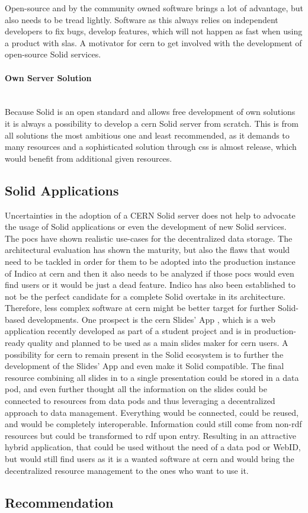 Open-source and by the community owned software brings a lot of advantage, but also needs to be tread lightly. Software as this always relies on independent developers to fix bugs, develop features, which will not happen as fast when using a product with \glspl{sla}. A motivator for \gls{cern} to get involved with the development of open-source Solid services.
\vspace{0.5cm}
\paragraph{Own Server Solution}\mbox{}\\

Because Solid is an open standard and allows free development of own solutions it is always a possibility to develop a \gls{cern} Solid server from scratch. This is from all solutions the most ambitious one and least recommended, as it demands to many resources and a sophisticated solution through \gls{css} is almost release, which would benefit from additional given resources.

\subsection{Solid Applications}

Uncertainties in the adoption of a CERN Solid server does not help to advocate the usage of Solid applications or even the development of new Solid services. The \glspl{poc} have shown realistic use-cases for the decentralized data storage. The architectural evaluation has shown the maturity, but also the flaws that would need to be tackled in order for them to be adopted into the production instance of Indico at \gls{cern} and then it also needs to be analyzed if those \glspl{poc} would even find users or it would be just a dead feature. Indico has also been established to not be the perfect candidate for a complete Solid overtake in its architecture. Therefore, less complex software at \gls{cern} might be better target for further Solid-based developments. One prospect is the \gls{cern} Slides' App \cite{cern-slides}, which is a web application recently developed as part of a student project and is in production-ready quality and planned to be used as a main slides maker for \gls{cern} users. A possibility for \gls{cern} to remain present in the Solid ecosystem is to further the development of the Slides' App and even make it Solid compatible. The final resource combining all slides in to a single presentation could be stored in a data pod, and even further thought all the information on the slides could be connected to resources from data pods and thus leveraging a decentralized approach to data management. Everything would be connected, could be reused, and would be completely interoperable. Information could still come from non-\gls{rdf} resources but could be transformed to \gls{rdf} upon entry. Resulting in an attractive hybrid application, that could be used without the need of a data pod or WebID, but would still find users as it is a wanted software at \gls{cern} and would bring the decentralized resource management to the ones who want to use it.

\subsection{Recommendation}

